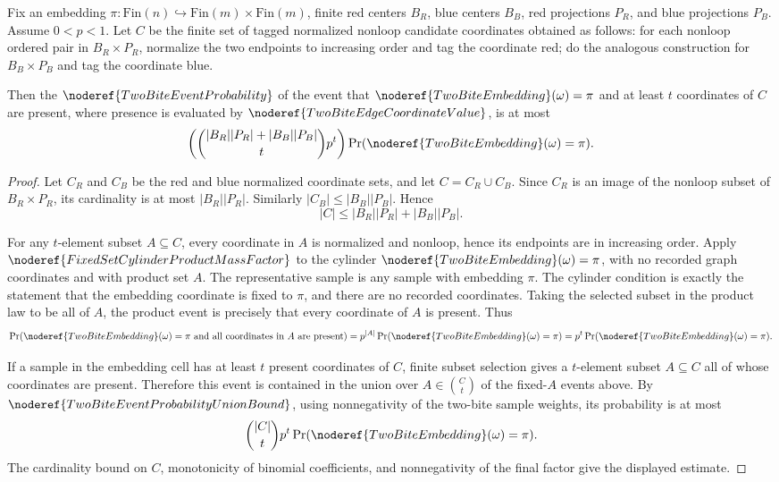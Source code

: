 \begin{lemma}
Fix an embedding \(\pi:\mathrm{Fin}(n)\hookrightarrow
\mathrm{Fin}(m)\times\mathrm{Fin}(m)\), finite red centers \(B_R\), blue
centers \(B_B\), red projections \(P_R\), and blue projections \(P_B\).
Assume \(0<p<1\).  Let \(C\) be the finite set of tagged normalized nonloop
candidate coordinates obtained as follows: for each nonloop ordered pair in
\(B_R\times P_R\), normalize the two endpoints to increasing order and tag the
coordinate red; do the analogous construction for \(B_B\times P_B\) and tag
the coordinate blue.

Then the \(\noderef{TwoBiteEventProbability}\) of the event that
\(\noderef{TwoBiteEmbedding}(\omega)=\pi\) and at least \(t\) coordinates of
\(C\) are present, where presence is evaluated by
\(\noderef{TwoBiteEdgeCoordinateValue}\), is at most
\[
\left(\binom{|B_R||P_R|+|B_B||P_B|}{t}p^t\right)
\Pr(\noderef{TwoBiteEmbedding}(\omega)=\pi).
\]
\end{lemma}
\begin{proof}
Let \(C_R\) and \(C_B\) be the red and blue normalized coordinate sets, and
let \(C=C_R\cup C_B\).  Since \(C_R\) is an image of the nonloop subset of
\(B_R\times P_R\), its cardinality is at most \(|B_R||P_R|\).  Similarly
\(|C_B|\le |B_B||P_B|\).  Hence
\[
|C|\le |B_R||P_R|+|B_B||P_B|.
\]

For any \(t\)-element subset \(A\subseteq C\), every coordinate in \(A\) is
normalized and nonloop, hence its endpoints are in increasing order.  Apply
\(\noderef{FixedSetCylinderProductMassFactor}\) to the cylinder
\(\noderef{TwoBiteEmbedding}(\omega)=\pi\), with no recorded graph
coordinates and with product set \(A\).  The representative sample is any
sample with embedding \(\pi\).  The cylinder condition is exactly the statement
that the embedding coordinate is fixed to \(\pi\), and there are no recorded
coordinates.  Taking the selected subset in the product law to be all of
\(A\), the product event is precisely that every coordinate of \(A\) is
present.  Thus
\[
\Pr(\noderef{TwoBiteEmbedding}(\omega)=\pi
  \text{ and all coordinates in }A\text{ are present})
=p^{|A|}
  \Pr(\noderef{TwoBiteEmbedding}(\omega)=\pi)
=p^t\Pr(\noderef{TwoBiteEmbedding}(\omega)=\pi).
\]

If a sample in the embedding cell has at least \(t\) present coordinates of
\(C\), finite subset selection gives a \(t\)-element subset
\(A\subseteq C\) all of whose coordinates are present.  Therefore this event
is contained in the union over \(A\in\binom Ct\) of the fixed-\(A\) events
above.  By \(\noderef{TwoBiteEventProbabilityUnionBound}\), using
nonnegativity of the two-bite sample weights, its probability is at most
\[
\binom{|C|}{t}p^t
\Pr(\noderef{TwoBiteEmbedding}(\omega)=\pi).
\]
The cardinality bound on \(C\), monotonicity of binomial coefficients, and
nonnegativity of the final factor give the displayed estimate.
\end{proof}
